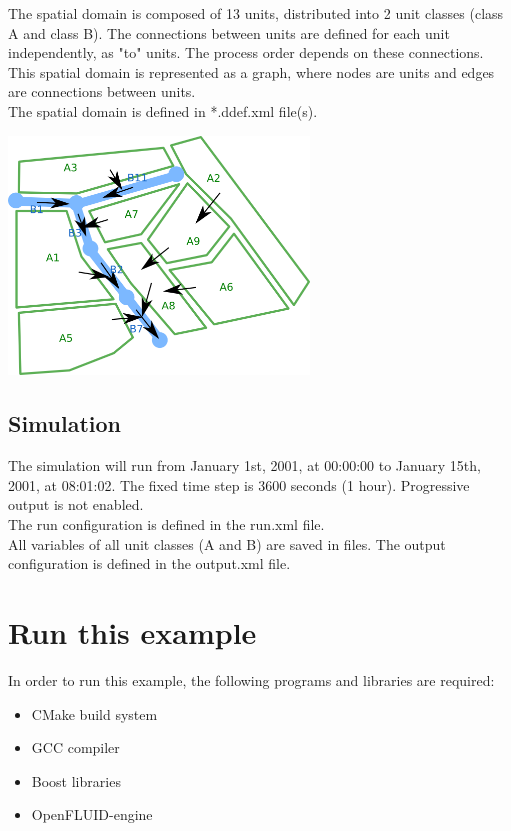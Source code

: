 \documentclass[a4paper,11pt]{article}
\begin{document}
The spatial domain is composed of 13 units, distributed into 2 unit classes 
(class A and class B). The connections between 
units are defined for each unit independently, as "to" units. The process order 
depends on these connections. This spatial domain is represented as a graph, 
where nodes are units and edges are connections between units.\\
The spatial domain is defined in *.ddef.xml file(s). 

\begin{center}
\includegraphics[width=8cm]{openfluid-engine_example-primitives_en/domain.png}
\end{center}


\bigskip
\bigskip

\subsection{Simulation}

The simulation will run from January 1st, 2001, at 00:00:00 to January 15th, 2001, at 08:01:02.
The fixed time step is 3600 seconds (1 hour). Progressive output is not enabled.\\
\noindent The run configuration is defined in the run.xml file.\\

\noindent All variables of all unit classes (A and B) are saved in files. The output
configuration is defined in the output.xml file.

\bigskip
\bigskip

\section{Run this example}

In order to run this example, the following programs and libraries are required:
\begin{itemize}
\item CMake build system
\item GCC compiler
\item Boost libraries
\item OpenFLUID-engine
\end{itemize}
\end{document}
